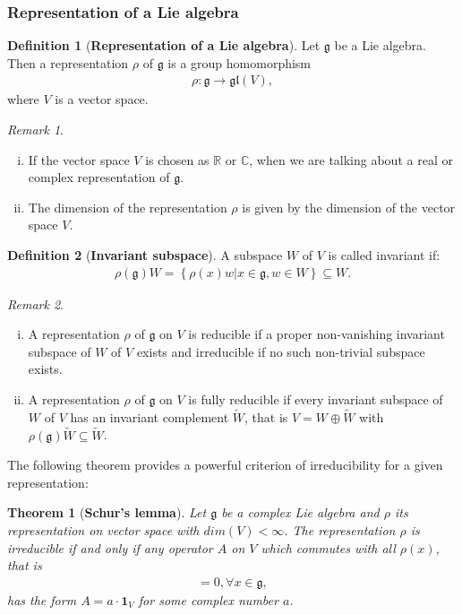 \documentclass[12pt,a4paper]{report}
\newtheorem{theorem}{Theorem}
\theoremstyle{definition}
\newtheorem{definition}{Definition}
\theoremstyle{remark}
\newtheorem*{remark}{Remark}
\theoremstyle{remark}
\begin{document}
\subsubsection{Representation of a Lie algebra}
\begin{definition}[\textbf{Representation of a Lie algebra}]
Let $\mathfrak{g}$ be a Lie algebra. Then a representation $\rho$ of $\mathfrak{g}$ is a group homomorphism
\begin{align*}
\rho:\mathfrak{g}\rightarrow\mathfrak{gl}(V),
\end{align*}
where $V$ is a vector space.
\end{definition}
\begin{remark}\mbox{}
\begin{enumerate}[i.]
\item If the vector space $V$ is chosen as $\mathbb{R}$ or $\mathbb{C}$, when we are talking about a real or complex representation of $\mathfrak{g}$.
\item The dimension of the representation $\rho$ is given by the dimension of the vector space $V$.
\end{enumerate}
\end{remark}
\begin{definition}[\textbf{Invariant subspace}]
A subspace $W$ of $V$ is called invariant if:
\begin{align*}
\rho(\mathfrak{g})W=\left\lbrace \rho(x)w|x\in\mathfrak{g},w\in W\right\rbrace\subseteq W.
\end{align*}
\begin{remark}\mbox{}
\begin{enumerate}[i.]
\item A representation $\rho$ of $\mathfrak{g}$ on $V$ is reducible if a proper non-vanishing invariant subspace of $W$ of $V$ exists and irreducible if no such non-trivial subspace exists.
\item  A representation $\rho$ of $\mathfrak{g}$ on $V$ is fully reducible if every invariant subspace of $W$ of $V$ has an invariant complement $\widetilde{W}$, that is $V=W\oplus\widetilde{W}$ with $\rho(\mathfrak{g})\widetilde{W}\subseteq \widetilde{W}$.
\end{enumerate}
\end{remark}
\end{definition}
The following theorem provides a powerful criterion of irreducibility for a given representation:
\begin{theorem}[\textbf{Schur's lemma}] Let $\mathfrak{g}$ be a complex Lie algebra and $\rho$ its representation on vector space with $dim(V)<\infty$. The representation $\rho$ is irreducible if and only if any operator $A$ on $V$ which commutes with all $\rho(x)$, that is
\begin{align*}
[A,\rho(x)]=0, \forall x\in\mathfrak{g},
\end{align*}
has the form $A=a\cdot\mathbf{1}_V$ for some complex number $a$.
\end{theorem}
\end{document}
